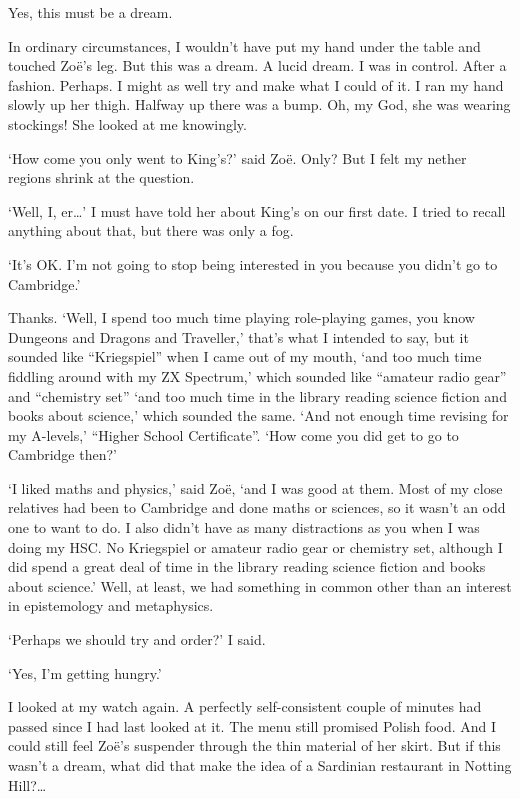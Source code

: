 Yes, this must be a dream.

In ordinary circumstances, I wouldn't have put my hand under the
table and touched Zo{\"e}'s leg. But this was a dream. A {\twelveit
lucid\/} dream. I was in control. After a fashion. Perhaps. I might
as well try and make what I could of it. I ran my hand slowly up her
thigh. Halfway up there was a bump. Oh, my God, she was wearing
stockings! She looked at me knowingly.

`How come you only went to King's?' said Zo{\"e}. Only? But I felt my nether
regions shrink at the question.

`Well, I, er\dots' I must have told her about King's on our first date. I tried to recall anything about that, but there was only a fog.

`It's OK. I'm not going to stop being interested in you because you
didn't go to Cambridge.'

Thanks. `Well, I spend too much time playing role-playing games, you know {\twelvesl Dungeons and
Dragons\/} and {\twelvesl Traveller},' that's what I intended to say, but it sounded like
``Kriegspiel'' when I came out of my mouth, `and too much time
fiddling around with my ZX Spectrum,' which sounded like ``amateur radio gear'' and ``chemistry set'' `and too much time in the library reading science fiction and books about science,' which sounded the same. `And not enough time revising for my A-levels,' ``Higher School Certificate''. `How come you {\twelveit did\/} get to go to Cambridge then?'

`I liked maths and physics,' said Zo{\"e}, `and I was good at them. Most of my close relatives had been to Cambridge and done maths or sciences, so it wasn't an odd one to want to do. I also didn't have as many distractions as you when I was doing my HSC. No Kriegspiel or amateur radio gear or chemistry set, although I did spend a great deal of time in the library reading science fiction and books about science.' Well, at least, we had something in common other than an interest in epistemology and metaphysics.

`Perhaps we should try and order?' I said.

`Yes, I'm getting hungry.'

I looked at my watch again. A perfectly self-consistent couple of minutes had passed since I had last looked at it. The menu still promised Polish food. And I could still feel Zo{\"e}'s suspender through the thin material of her skirt.
But if this wasn't a dream, what did that make the idea of a Sardinian restaurant in Notting Hill?\dots

